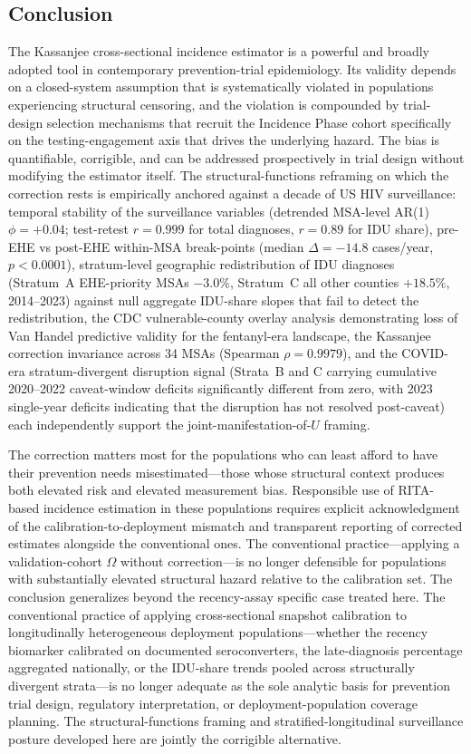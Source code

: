 \documentclass[12pt]{article}
\begin{document}
\subsection{Conclusion}

The Kassanjee cross-sectional incidence estimator is a powerful and broadly adopted tool in contemporary prevention-trial epidemiology. Its validity depends on a closed-system assumption that is systematically violated in populations experiencing structural censoring, and the violation is compounded by trial-design selection mechanisms that recruit the Incidence Phase cohort specifically on the testing-engagement axis that drives the underlying hazard. The bias is quantifiable, corrigible, and can be addressed prospectively in trial design without modifying the estimator itself. The structural-functions reframing on which the correction rests is empirically anchored against a decade of US HIV surveillance: temporal stability of the surveillance variables (detrended MSA-level AR(1) $\phi = +0.04$; test-retest $r = 0.999$ for total diagnoses, $r = 0.89$ for IDU share), pre-EHE vs post-EHE within-MSA break-points (median $\Delta = -14.8$ cases/year, $p < 0.0001$), stratum-level geographic redistribution of IDU diagnoses (Stratum~A EHE-priority MSAs $-3.0\%$, Stratum~C all other counties $+18.5\%$, 2014--2023) against null aggregate IDU-share slopes that fail to detect the redistribution, the CDC vulnerable-county overlay analysis demonstrating loss of Van Handel predictive validity for the fentanyl-era landscape, the Kassanjee correction invariance across 34 MSAs (Spearman $\rho = 0.9979$), and the COVID-era stratum-divergent disruption signal (Strata~B and C carrying cumulative 2020--2022 caveat-window deficits significantly different from zero, with 2023 single-year deficits indicating that the disruption has not resolved post-caveat) each independently support the joint-manifestation-of-$U$ framing.

The correction matters most for the populations who can least afford to have their prevention needs misestimated---those whose structural context produces both elevated risk and elevated measurement bias. Responsible use of RITA-based incidence estimation in these populations requires explicit acknowledgment of the calibration-to-deployment mismatch and transparent reporting of corrected estimates alongside the conventional ones. The conventional practice---applying a validation-cohort $\Omega$ without correction---is no longer defensible for populations with substantially elevated structural hazard relative to the calibration set. The conclusion generalizes beyond the recency-assay specific case treated here. The conventional practice of applying cross-sectional snapshot calibration to longitudinally heterogeneous deployment populations---whether the recency biomarker calibrated on documented seroconverters, the late-diagnosis percentage aggregated nationally, or the IDU-share trends pooled across structurally divergent strata---is no longer adequate as the sole analytic basis for prevention trial design, regulatory interpretation, or deployment-population coverage planning. The structural-functions framing and stratified-longitudinal surveillance posture developed here are jointly the corrigible alternative.
\end{document}
